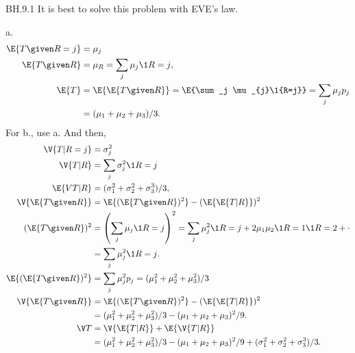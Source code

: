 
\setcounter{theorem}{0}
\begin{exercise} BH.9.1
 It is best to solve this problem with EVE's law.
\begin{solution}
a.
\begin{align*}
\E{T\given R=j} &= \mu_{j} \\
\E{T\given R} &= \mu_{R} = \sum_j \mu_j \1{R=j},\\
\E{T} &= \E{\E{T\given R}} = \E{\sum_j \mu_{j}\1{R=j}} = \sum_j\mu_{j}p_{j} \\
&=(\mu_{1}+\mu_2+\mu_3)/3.
\end{align*}
For b., use a. And then,
\begin{align*}
\V{T|R=j} &= \sigma_j^2 \\
\V{T|R} &= \sum_j\sigma_j^2\1{R=j} \\
\E{V{T|R}} &= (\sigma_1^2+\sigma_2^2+\sigma_3^3)/3,\\
\V{\E{T\given R}}
&= \E{(\E{T\given R})^{2}}  - (\E{\E{T|R}})^2 \\
(\E{T\given R})^{2}
&= \left(\sum_j \mu_j \1{R=j}\right)^{2}
= \sum_j \mu_j^{2} \1{R=j} + 2\mu_1 \mu_2\1{R=1}\1{R=2} + \cdot\\
&= \sum_j \mu_j^{2} \1{R=j}.\\
\E{(\E{T\given R})^{2}} &= \sum_j\mu_j^{2}p_j= (\mu_1^2+\mu_2^2+\mu_{3}^2)/3\\
\V{\E{T\given R}}
&= \E{(\E{T\given R})^{2}}  - (\E{\E{T|R}})^2 \\
&=(\mu_1^2+\mu_2^2+\mu_{3}^2)/3 - (\mu_1+\mu_2+\mu_3)^2/9.  \\
\V T
 &= \V{\E{T|R}} + \E{\V{T|R}} \\
&=(\mu_1^2+\mu_2^2+\mu_{3}^2)/3 - (\mu_1+\mu_2+\mu_3)^2/9 + (\sigma_1^2+\sigma_2^2+\sigma_3^3)/3.
 \end{align*}
\end{solution}
\end{exercise}

